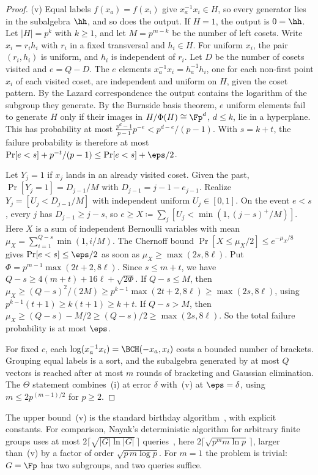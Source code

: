 \begin{proof}
(v) Equal labels $f(x_a) = f(x_i)$ give $x_a^{-1}x_i \in H$, so every generator lies in the subalgebra $\hh$, and so does the output. If $H = 1$, the output is $0 = \hh$. Let $|H| = p^k$ with $k\ge 1$, and let $M = p^{m-k}$ be the number of left cosets. Write $x_i = r_ih_i$ with $r_i$ in a fixed transversal and $h_i\in H$. For uniform $x_i$, the pair $(r_i,h_i)$ is uniform, and $h_i$ is independent of $r_i$. Let $D$ be the number of cosets visited and $e = Q-D$. The $e$ elements $x_a^{-1}x_i = h_a^{-1}h_i$, one for each non-first point $x_i$ of each visited coset, are independent and uniform on $H$, given the coset pattern. By the Lazard correspondence the output contains the logarithm of the subgroup they generate. By the Burnside basis theorem, $e$ uniform elements fail to generate $H$ only if their images in $H/\Phi(H)\cong\Fp^{d}$, $d\le k$, lie in a hyperplane. This has probability at most $\frac{p^d-1}{p-1}p^{-e} < p^{d-e}/(p-1)$. With $s = k+t$, the failure probability is therefore at most $\Pr[e<s] + p^{-t}/(p-1) \le \Pr[e<s] + \eps/2$.

Let $Y_j = 1$ if $x_j$ lands in an already visited coset. Given the past, $\Pr[Y_j = 1] = D_{j-1}/M$ with $D_{j-1} = j-1-e_{j-1}$. Realize $Y_j = [U_j < D_{j-1}/M]$ with independent uniform $U_j \in [0,1]$. On the event $e < s$, every $j$ has $D_{j-1} \ge j-s$, so $e \ge X \coloneqq \sum_j [U_j < \min(1,(j-s)^+/M)]$. Here $X$ is a sum of independent Bernoulli variables with mean $\mu_X = \sum_{i=1}^{Q-s}\min(1,i/M)$. The Chernoff bound $\Pr[X \le \mu_X/2] \le e^{-\mu_X/8}$ gives $\Pr[e<s] \le \eps/2$ as soon as $\mu_X \ge \max(2s, 8\ell)$. Put $\Phi = p^{m-1}\max(2t+2,8\ell)$. Since $s\le m+t$, we have $Q-s \ge 4(m+t) + 16\ell + \sqrt{2\Phi}$. If $Q-s \le M$, then $\mu_X \ge (Q-s)^2/(2M) \ge p^{k-1}\max(2t+2,8\ell) \ge \max(2s,8\ell)$, using $p^{k-1}(t+1) \ge k(t+1) \ge k+t$. If $Q-s > M$, then $\mu_X \ge (Q-s)-M/2 \ge (Q-s)/2 \ge \max(2s,8\ell)$. So the total failure probability is at most $\eps$.

For fixed $c$, each $\log(x_a^{-1}x_i) = \BCH(-x_a,x_i)$ costs a bounded number of brackets. Grouping equal labels is a sort, and the subalgebra generated by at most $Q$ vectors is reached after at most $m$ rounds of bracketing and Gaussian elimination. The $\Theta$ statement combines~(i) at error $\delta$ with~(v) at $\eps = \delta$, using $m \le 2p^{(m-1)/2}$ for $p\ge 2$.
\end{proof}

The upper bound~(v) is the standard birthday algorithm~\cite[Section~1]{Nayak2022}, with explicit constants. For comparison, Nayak's deterministic algorithm for arbitrary finite groups uses at most $2\lceil\sqrt{|G|\ln|G|}\,\rceil$ queries~\cite[Corollary~4.2]{Nayak2022}, here $2\lceil\sqrt{p^m m\ln p}\,\rceil$, larger than~(v) by a factor of order $\sqrt{p\,m\log p}$. For $m=1$ the problem is trivial: $G = \Fp$ has two subgroups, and two queries suffice.

